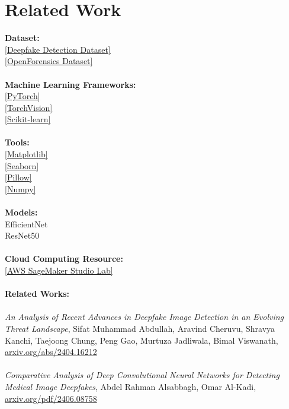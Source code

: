 \documentclass[conference]{IEEEtran}
\begin{document}
\section*{Related Work}
\textbf{Dataset:}  \\
\href{https://www.kaggle.com/datasets/manjilkarki/deepfake-and-real-images/data}{[Deepfake Detection Dataset]} \\
\href{https://zenodo.org/records/5528418\#.YpdlS2hBzDd}{[OpenForensics Dataset]} \\ \\
\textbf{Machine Learning Frameworks:} \\ 
\href{https://pytorch.org/}{[PyTorch]} \\
\href{https://pytorch.org/vision/stable/index.html}{[TorchVision]} \\
\href{https://scikit-learn.org/stable/}{[Scikit-learn]} \\ \\
\textbf{Tools:}  \\
\href{https://matplotlib.org/}{[Matplotlib]} \\
\href{https://seaborn.pydata.org/}{[Seaborn]} \\
\href{https://pillow.readthedocs.io/en/stable/}{[Pillow]} \\
\href{https://numpy.org/}{[Numpy]} \\ \\
\textbf{Models:}  \\
EfficientNet \\
ResNet50 \\ \\
\textbf{Cloud Computing Resource:}  \\
\href{https://studiolab.sagemaker.aws/}{[AWS SageMaker Studio Lab]} \\ \\
\textbf{Related Works:}  \\ \\
\textit{An Analysis of Recent Advances in Deepfake Image Detection in an
Evolving Threat Landscape}, Sifat Muhammad Abdullah, Aravind Cheruvu, Shravya Kanchi, Taejoong Chung, Peng Gao, Murtuza Jadliwala, Bimal Viswanath, \href{https://arxiv.org/pdf/2404.16212}{arxiv.org/abs/2404.16212} \\ \\
\textit{Comparative Analysis of Deep Convolutional Neural Networks
for Detecting Medical Image Deepfakes}, Abdel Rahman Alsabbagh, Omar Al-Kadi, \href{https://arxiv.org/abs/2406.08758}{arxiv.org/pdf/2406.08758} \\ \\
\end{document}
